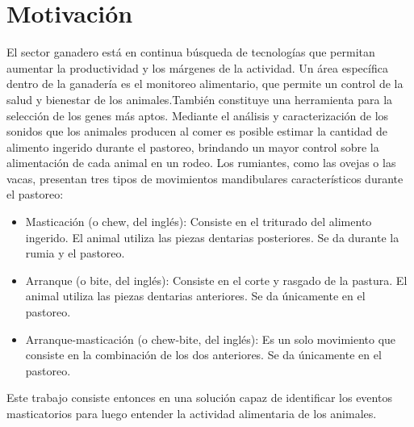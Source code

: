 \documentclass[11pt]{charter}
\begin{document}
\maketitle
\thispagestyle{empty}
\pagebreak


\thispagestyle{empty}
{\setlength{\parskip}{0pt}
\tableofcontents{}
}
\pagebreak




\section{Motivación}
\label{sec:descripcion}

El sector ganadero está en continua búsqueda de tecnologías que permitan aumentar la productividad y los márgenes de la actividad. Un área específica dentro de la ganadería es el monitoreo alimentario, que permite un control de la salud y bienestar de los animales.También constituye una herramienta para la selección de los genes más aptos.
Mediante el análisis y caracterización de los sonidos que los animales producen al comer es posible estimar la cantidad de alimento ingerido durante el pastoreo, brindando un mayor control sobre la alimentación de cada animal en un rodeo.
Los rumiantes, como las ovejas o las vacas, presentan tres tipos de movimientos
mandibulares característicos durante el pastoreo:
\begin{itemize}
	\item Masticación (o chew, del inglés): Consiste en el triturado del alimento ingerido. El animal utiliza las piezas dentarias posteriores. Se da durante la rumia y el pastoreo.
	\item Arranque (o bite, del inglés): Consiste en el corte y rasgado de la pastura. El animal utiliza las piezas dentarias anteriores. Se da únicamente en el pastoreo.
	\item Arranque-masticación (o chew-bite, del inglés): Es un solo movimiento que consiste en la combinación de los dos anteriores. Se da únicamente en el pastoreo.
 
\end{itemize}

Este trabajo consiste entonces en una solución capaz de identificar los eventos masticatorios para luego entender la actividad alimentaria de los animales.
\end{document}
